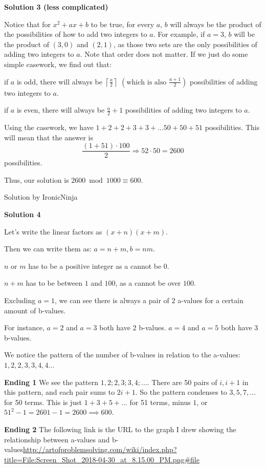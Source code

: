 \begin{enumerate}
\textbf{Solution 3 (less complicated)}

Notice that for $x^2+ax+b$ to be true, for every $a$, $b$ will always be the product of the possibilities of how to add two integers to $a$. For example, if $a=3$, $b$ will be the product of $(3,0)$ and $(2,1)$, as those two sets are the only possibilities of adding two integers to $a$. Note that order does not matter. If we just do some simple casework, we find out that: 

 if $a$ is odd, there will always be $\left\lceil\frac{a}{2}\right\rceil$ $\left(\text{which is also }\frac{a+1}{2}\right)$ possibilities of adding two integers to $a$.

 if $a$ is even, there will always be $\frac{a}{2}+1$ possibilities of adding two integers to $a$. 

 Using the casework, we have $1+2+2+3+3+...50+50+51$ possibilities. This will mean that the answer is 
 \[\frac{(1+51)\cdot100}{2}\Rightarrow52\cdot50=2600\] possibilities.

 Thus, our solution is $2600\bmod {1000}\equiv\boxed{600}$.

 Solution by IronicNinja~

 



\textbf{Solution 4}

Let's write the linear factors as $(x+n)(x+m)$.

 Then we can write them as: $a=n+m, b=nm$.

 $n$ or $m$ has to be a positive integer as a cannot be 0.

 $n+m$ has to be between $1$ and $100$, as a cannot be over $100$.

 Excluding $a=1$, we can see there is always a pair of $2$ a-values for a certain amount of b-values. 

 For instance, $a=2$ and $a=3$ both have $2$ b-values. $a=4$ and $a=5$ both have $3$ b-values.

 We notice the pattern of the number of b-values in relation to the a-values:$1, 2, 2, 3, 3, 4, 4\ldots$

 \textbf{Ending 1} We see the pattern $1, 2; 2, 3; 3, 4; ...$. There are 50 pairs of $i, i+1$ in this pattern, and each pair sums to $2i+1$. So the pattern condenses to $3, 5, 7, ...$ for 50 terms. This is just $1+3+5+...$ for 51 terms, minus $1$, or $51^2-1=2601-1=2600\implies\boxed{600}$.

 \textbf{Ending 2} The following link is the URL to the graph I drew showing the relationship between a-values and b-values\href{https://artofproblemsolving.comhttp://artofproblemsolving.com/wiki/index.php?title=File:Screen\_Shot\_2018-04-30\_at\_8.15.00\_PM.png\#file}{http://artofproblemsolving.com/wiki/index.php?title=File:Screen\_Shot\_2018-04-30\_at\_8.15.00\_PM.png\#file}


\end{enumerate}
